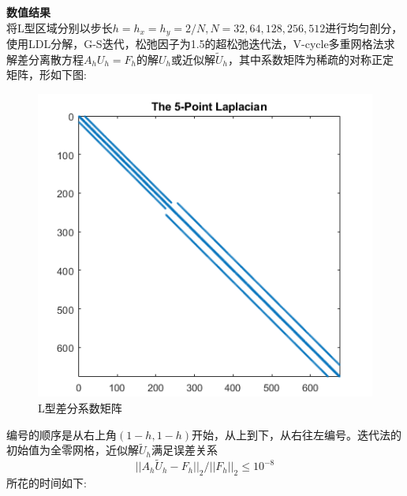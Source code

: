 \documentclass[12pt,fontset=mac]{ctexart}
\begin{document}
\noindent \textbf{数值结果}\\
将L型区域分别以步长$h=h_x=h_y=2/N,N=32,64,128,256,512$进行均匀剖分，使用LDL分解，G-S迭代，松弛因子为1.5的超松弛迭代法，V-cycle多重网格法求解差分离散方程$A_hU_h=F_h$的解$U_h$或近似解$\tilde{U}_h$，其中系数矩阵为稀疏的对称正定矩阵，形如下图:\\
\begin{figure}[H]
	\centering
	\includegraphics[width=12cm]{差分矩阵.png}
	\caption{L型差分系数矩阵}
\end{figure}
\noindent 编号的顺序是从右上角$(1-h,1-h)$开始，从上到下，从右往左编号。迭代法的初始值为全零网格，近似解$\tilde{U}_h$满足误差关系$$||A_h\tilde{U}_h-F_h||_2/||F_h||_2 \le 10^{-8} $$所花的时间如下:\\
\end{document}
